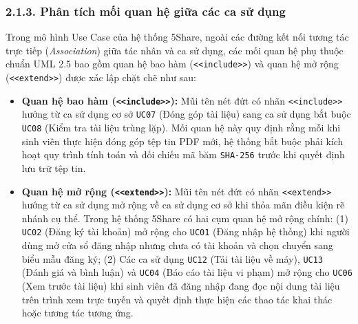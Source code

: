 \subsubsection{2.1.3. Phân tích mối quan hệ giữa các ca sử dụng}
Trong mô hình Use Case của hệ thống 5Share, ngoài các đường kết nối tương tác trực tiếp (\textit{Association}) giữa tác nhân và ca sử dụng, các mối quan hệ phụ thuộc chuẩn UML 2.5 bao gồm quan hệ bao hàm (\texttt{<<include>>}) và quan hệ mở rộng (\texttt{<<extend>>}) được xác lập chặt chẽ như sau:
\begin{itemize}[leftmargin=*,noitemsep]
    \item \textbf{Quan hệ bao hàm (\texttt{<<include>>}):} Mũi tên nét đứt có nhãn \texttt{<<include>>} hướng từ ca sử dụng cơ sở \texttt{UC07} (Đóng góp tài liệu) sang ca sử dụng bắt buộc \texttt{UC08} (Kiểm tra tài liệu trùng lặp). Mối quan hệ này quy định rằng mỗi khi sinh viên thực hiện đóng góp tệp tin PDF mới, hệ thống bắt buộc phải kích hoạt quy trình tính toán và đối chiếu mã băm \texttt{SHA-256} trước khi quyết định lưu trữ tệp tin.
    \item \textbf{Quan hệ mở rộng (\texttt{<<extend>>}):} Mũi tên nét đứt có nhãn \texttt{<<extend>>} hướng từ ca sử dụng mở rộng về ca sử dụng cơ sở khi thỏa mãn điều kiện rẽ nhánh cụ thể. Trong hệ thống 5Share có hai cụm quan hệ mở rộng chính: (1) \texttt{UC02} (Đăng ký tài khoản) mở rộng cho \texttt{UC01} (Đăng nhập hệ thống) khi người dùng mở cửa sổ đăng nhập nhưng chưa có tài khoản và chọn chuyển sang biểu mẫu đăng ký; (2) Các ca sử dụng \texttt{UC12} (Tải tài liệu về máy), \texttt{UC13} (Đánh giá và bình luận) và \texttt{UC04} (Báo cáo tài liệu vi phạm) mở rộng cho \texttt{UC06} (Xem trước tài liệu) khi sinh viên đã đăng nhập đang đọc nội dung tài liệu trên trình xem trực tuyến và quyết định thực hiện các thao tác khai thác hoặc tương tác tương ứng.
\end{itemize}
